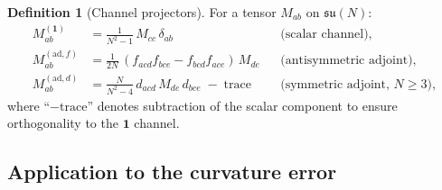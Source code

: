 \documentclass[11pt,a4paper]{article}
\theoremstyle{plain}
\theoremstyle{definition}
\newtheorem{definition}[theorem]{Definition}
\theoremstyle{remark}
\newcommand{\su}{\mathfrak{su}}
\newcommand{\ad}{\mathrm{ad}}
\begin{document}
\begin{definition}[Channel projectors]\label{def:projectors}
For a tensor $M_{ab}$ on $\su(N)$:
\begin{align}
M^{(\mathbf{1})}_{ab} &= \frac{1}{N^2-1}\,M_{cc}\,\delta_{ab}
&&\text{(scalar channel)}, \label{eq:proj-scalar}\\
M^{(\ad,f)}_{ab} &= \frac{1}{2N}\,
(f_{acd}f_{bce} - f_{bcd}f_{ace})\,M_{de}
&&\text{(antisymmetric adjoint)}, \label{eq:proj-f}\\
M^{(\ad,d)}_{ab} &= \frac{N}{N^2-4}\,
d_{acd}\,M_{de}\,d_{bce}\;
-\;\text{trace}
&&\text{(symmetric adjoint, $N\geq 3$)}, \label{eq:proj-d}
\end{align}
where ``$-\text{trace}$'' denotes subtraction of the scalar
component to ensure orthogonality to the $\mathbf{1}$ channel.
\end{definition}


\subsection{Application to the curvature error}
\end{document}
